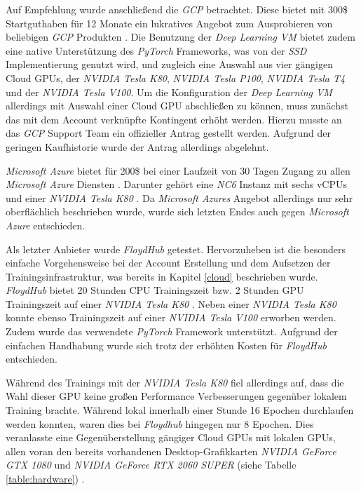 Auf Empfehlung wurde anschließend die \textit{GCP} betrachtet. Diese bietet mit 300\$ Startguthaben für 12 Monate ein lukratives Angebot zum Ausprobieren von beliebigen \textit{GCP} Produkten \cite{GoogleCloudPlatform.20200314b}. Die Benutzung der \textit{Deep Learning VM} bietet zudem eine native Unterstützung des \textit{PyTorch} Frameworks, was von der \textit{SSD} Implementierung genutzt wird, und zugleich eine Auswahl aus vier gängigen Cloud GPUs, der \textit{NVIDIA Tesla K80}, \textit{NVIDIA Tesla P100}, \textit{NVIDIA Tesla T4} und der \textit{NVIDIA Tesla V100}. Um die Konfiguration der \textit{Deep Learning VM} allerdings mit Auswahl einer Cloud GPU abschließen zu können, muss zunächst das mit dem Account verknüpfte Kontingent erhöht werden. Hierzu musste an das \textit{GCP} Support Team ein offizieller Antrag gestellt werden. Aufgrund der geringen Kaufhistorie wurde der Antrag allerdings abgelehnt. 

\textit{Microsoft Azure} bietet für 200\$ bei einer Laufzeit von 30 Tagen Zugang zu allen \textit{Microsoft Azure} Diensten \cite{MicrosoftAzure.2020}. Darunter gehört eine \textit{NC6} Instanz mit sechs vCPUs und einer \textit{NVIDIA Tesla K80} \cite{MicrosoftAzure.202003124}. Da \textit{Microsoft Azures} Angebot allerdings nur sehr oberflächlich beschrieben wurde, wurde sich letzten Endes auch gegen \textit{Microsoft Azure} entschieden. 

Als letzter Anbieter wurde \textit{FloydHub} getestet. Hervorzuheben ist die besonders einfache Vorgehensweise bei der Account Erstellung und dem Aufsetzen der Trainingsinfrastruktur, was bereits in Kapitel \ref{cloud} beschrieben wurde. \textit{FloydHub} bietet 20 Stunden CPU Trainingszeit bzw. 2 Stunden GPU Trainingszeit auf einer \textit{NVIDIA Tesla K80} \cite{FloydHub.2020}. Neben einer \textit{NVIDIA Tesla K80} konnte ebenso Trainingszeit auf einer \textit{NVIDIA Tesla V100} erworben werden. Zudem wurde das verwendete \textit{PyTorch} Framework unterstützt. Aufgrund der einfachen Handhabung wurde sich trotz der erhöhten Kosten für \textit{FloydHub} entschieden. 

Während des Trainings mit der \textit{NVIDIA Tesla K80} fiel allerdings auf, dass die Wahl dieser GPU keine großen Performance Verbesserungen gegenüber lokalem Training brachte. Während lokal innerhalb einer Stunde 16 Epochen durchlaufen werden konnten, waren dies bei \textit{Floydhub} hingegen nur 8 Epochen. Dies veranlasste eine Gegenüberstellung gängiger Cloud GPUs mit lokalen GPUs, allen voran den bereits vorhandenen Desktop-Grafikkarten \textit{NVIDIA GeForce GTX 1080} und \textit{NVIDIA GeForce RTX 2060 SUPER} (siehe Tabelle \ref{table:hardware}) \cite{TechPowerUp.20200209}.

